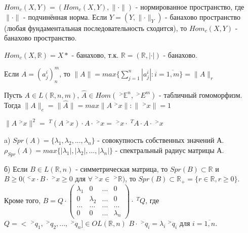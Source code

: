 \documentclass[__main__.tex]{subfiles}
\begin{document}
\begin{statement}
	$Hom_c(X,Y) = (Hom_c(X,Y), \lVert \cdot \rVert)$ - нормированное пространство, где $\lVert \cdot \rVert$ - подчинённая норма. Если  $Y = (Y, \lVert \cdot \rVert_Y)$ - банахово пространство (любая фундаментальная последовательность сходится), то $Hom_c(X,Y)$ - банахово пространство.
\end{statement}

\begin{statement}
	$Hom_c(X, \mathbb{R}) = X*$ - банахово, т.к. $\mathbb{R} = (\mathbb{R}, | \cdot |)$ - банахово.
\end{statement}

\begin{statement}
	Если $A = (a^i_j)^m_n$, то $\lVert A \rVert = max \lbrace \sum_{j=1}^{n}| a^i_j | : i=\overline{1,m} \rbrace = \lVert A \rVert_r$
\end{statement}

Пусть $A \in L(\mathbb{R},n,m)$, $\hat{A} \in Hom(\;^{>}\mathbb{E}^n, \;^{>}E^m)$ - табличный гомоморфизм. Тогда $\lVert A \rVert_e  = \lVert \hat{A} \rVert = max {\lVert A \;^{>}x \rVert : \lVert \;^{>}x \rVert = 1}$

$\lVert A \;^{>}x \rVert^2 = \;^{T}(A \;^{>}x) \cdot A \cdot \;^{>}x = \;^{>}x \cdot \;^{T}A \cdot A \cdot \;^{>}x$

\begin{definition}
	a) $Spr(A) = \lbrace \lambda_1, \lambda_2, ... , \lambda_n \rbrace$ - совокупность собственных значений А. $\rho_{Spr}(A) = max \lbrace |\lambda_1|, |\lambda_2|, ... , |\lambda_n| \rbrace$ - спектральный радиус матрицы А.
	
	б) Если $B \in L(\mathbb{R},n)$ - симметрическая матрица, то $Spr(B) \subset \mathbb{R}$ и $B \geqslant 0 (\;^{<}x \cdot B \cdot \;^{>}x \geqslant 0$ для $\forall \;^{>}x \in \;^{>} \mathbb{R})$, то $Spr(B) \subset \mathbb{R}_+ = \lbrace r \in \mathbb{R}, r \geqslant 0 \rbrace$. Кроме того, $B = Q \cdot \left(
	\begin{matrix}
	\lambda_1 & 0 & ... & 0 \\
	0 & \lambda_2 & ... & 0 \\
	... & ... & ... & ... \\
	0 & 0 & ... & \lambda_n
	\end{matrix}
	\right) \cdot \;^{T}Q$, где $Q = < \;^{>}q_1, \;^{>}q_2, ... , \;^{>}q_n] \in OL(\mathbb{R},n)$
	$B \cdot \;^{>}q_i = \lambda_i \;^{>}q_i$ для $i=\overline{1,n}$.
\end{definition}
\end{document}
